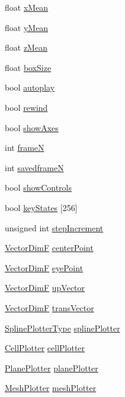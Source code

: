 \begin{DoxyCompactItemize}
float \hyperlink{structmodel_1_1_d_dgl_af8bbc01276094925cacd496bfaaf32bd}{x\+Mean}
\item 
float \hyperlink{structmodel_1_1_d_dgl_a6fe1a3560c4445889102963e9d65625d}{y\+Mean}
\item 
float \hyperlink{structmodel_1_1_d_dgl_a98ddb3ec25cb6bfefe0505b9a79643d4}{z\+Mean}
\item 
float \hyperlink{structmodel_1_1_d_dgl_ab349ba36feac9a68dd66c0aaa3ba37c0}{box\+Size}
\item 
bool \hyperlink{structmodel_1_1_d_dgl_ab58a41d3eb4679e96a2ab15043fa88d3}{autoplay}
\item 
bool \hyperlink{structmodel_1_1_d_dgl_a4cd45fc7cf705db213ba02575f8d479e}{rewind}
\item 
bool \hyperlink{structmodel_1_1_d_dgl_abb563580ed3aea0576c99adc5291eae3}{show\+Axes}
\item 
int \hyperlink{structmodel_1_1_d_dgl_adbc0a9d8cb82b872dd9d0a9704bef392}{frame\+N}
\item 
int \hyperlink{structmodel_1_1_d_dgl_a8bddc6ee4a239f82190220edce3a98af}{savedframe\+N}
\item 
bool \hyperlink{structmodel_1_1_d_dgl_a57653bea5d1a5c1d8f4af028cb8941c8}{show\+Controls}
\item 
bool \hyperlink{structmodel_1_1_d_dgl_a2b7fce653241955a75d2c096dd337dea}{key\+States} \mbox{[}256\mbox{]}
\item 
unsigned int \hyperlink{structmodel_1_1_d_dgl_a42d69fd8a14c2b6333f157c39621cdfd}{step\+Increment}
\item 
\hyperlink{structmodel_1_1_d_dgl_a62488dd3f15b5fdbc3af48f939d14315}{Vector\+Dim\+F} \hyperlink{structmodel_1_1_d_dgl_a1a2b493fc2c1117d3e7c54519c0cb676}{center\+Point}
\item 
\hyperlink{structmodel_1_1_d_dgl_a62488dd3f15b5fdbc3af48f939d14315}{Vector\+Dim\+F} \hyperlink{structmodel_1_1_d_dgl_af4272f1d028cf9100f4b20610ddc71fb}{eye\+Point}
\item 
\hyperlink{structmodel_1_1_d_dgl_a62488dd3f15b5fdbc3af48f939d14315}{Vector\+Dim\+F} \hyperlink{structmodel_1_1_d_dgl_a60a4f11d333d8a955538ddd66cb19880}{up\+Vector}
\item 
\hyperlink{structmodel_1_1_d_dgl_a62488dd3f15b5fdbc3af48f939d14315}{Vector\+Dim\+F} \hyperlink{structmodel_1_1_d_dgl_a1572b928baa53075414bcf155ac90b71}{trans\+Vector}
\item 
\hyperlink{structmodel_1_1_d_dgl_aecff5e88105f42e8ba511771664a9fed}{Spline\+Plotter\+Type} \hyperlink{structmodel_1_1_d_dgl_af05c4dbe1ad669b46b81d7fc6d821f5a}{spline\+Plotter}
\item 
\hyperlink{classmodel_1_1_cell_plotter}{Cell\+Plotter} \hyperlink{structmodel_1_1_d_dgl_ae1da1ce8a93f191bdcbd7f0f81952cbb}{cell\+Plotter}
\item 
\hyperlink{classmodel_1_1_plane_plotter}{Plane\+Plotter} \hyperlink{structmodel_1_1_d_dgl_acd5dc0cb55ae2a3b2670a3186157617c}{plane\+Plotter}
\item 
\hyperlink{classmodel_1_1_mesh_plotter}{Mesh\+Plotter} \hyperlink{structmodel_1_1_d_dgl_aed5871c5477c6ed6b2e99942b55ae9e0}{mesh\+Plotter}
\end{DoxyCompactItemize}

